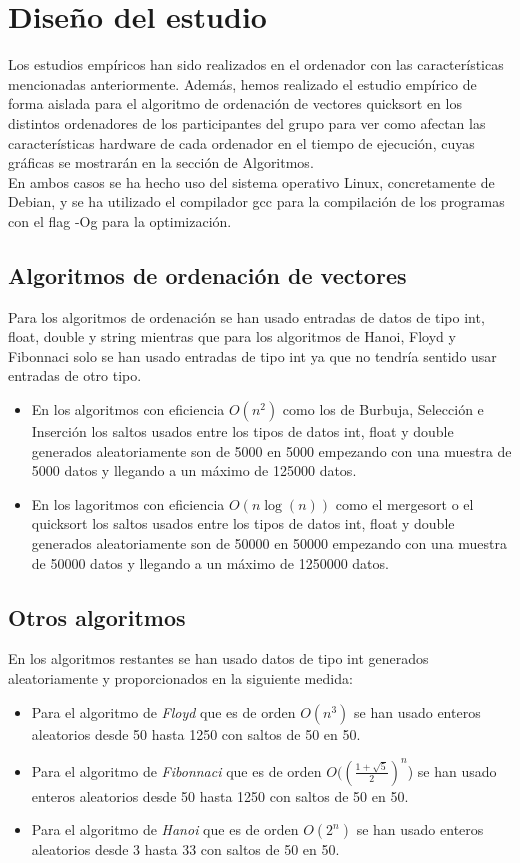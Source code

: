\documentclass[11pt,openany]{book}
\begin{document}
\chapter{Diseño del estudio}

    Los estudios empíricos han sido realizados en el ordenador con las características mencionadas anteriormente.
    Además, hemos realizado el estudio empírico de forma aislada para el algoritmo de ordenación de vectores
    quicksort en los distintos ordenadores de los participantes del grupo para ver como afectan las características
    hardware de cada ordenador en el tiempo de ejecución, cuyas gráficas se mostrarán en la sección de Algoritmos. \\
    En ambos casos se ha hecho uso del sistema operativo Linux, concretamente de Debian, y se ha utilizado el
    compilador gcc para la compilación de los programas  con el flag -Og para la optimización.
    \section{Algoritmos de ordenación de vectores}
    Para los algoritmos de ordenación se han usado entradas de datos de tipo int, float, double y string mientras que para los algoritmos de Hanoi, Floyd  y Fibonnaci solo se han usado entradas de tipo int 
    ya que no tendría sentido usar entradas de otro tipo. 
    \begin{itemize}
        \item En los algoritmos con eficiencia  \(O(n^2)\) como los de Burbuja, Selección e Inserción los saltos usados entre los tipos de datos int, float y double generados aleatoriamente son de 5000 en 5000 empezando con una muestra de 5000 datos y llegando a
        un máximo de 125000 datos.
        \item En los lagoritmos con eficiencia \(O (n\log(n))\) como el mergesort o el quicksort los saltos usados entre los tipos de datos int, float y double generados aleatoriamente son de 50000 en 50000 empezando con una muestra de 50000 datos y llegando a
        un máximo de 1250000 datos.
    \end{itemize}

    \section{Otros algoritmos}
    En los algoritmos restantes se han usado datos de tipo int generados aleatoriamente y proporcionados en la siguiente medida:
    \begin{itemize}
        \item Para el algoritmo de \textit{Floyd}  que es de orden \(O(n^3)\) se han usado enteros aleatorios desde 50 hasta 1250 con saltos de 50 en 50.
        \item Para el algoritmo de \textit{Fibonnaci}  que es de orden \(O((\frac{1+\sqrt{5}}{2})^n\)) se han usado enteros aleatorios desde 50 hasta 1250 con saltos de 50 en 50.
        \item Para el algoritmo de \textit{Hanoi} que es de orden \(O(2^n)\) se han usado enteros aleatorios desde 3 hasta 33 con saltos de 50 en 50. 
    \end{itemize}
\end{document}
